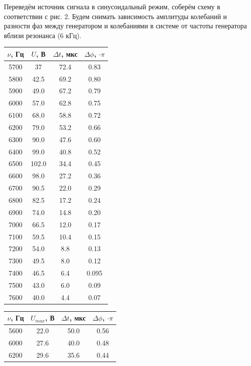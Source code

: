 \documentclass[a4paper,12pt]{extarticle}
\begin{document}
Переведём источник сигнала в синусоидальный режим, соберём схему в соответствии с рис. 2. Будем снимать зависимость амплитуды колебаний и разности фаз между генератором и колебаниями в системе от частоты генератора вблизи резонанса (6 кГц).
\begin{table}[h]
		\centering
		\begin{tabular}{|c|c|c|c|}
			\hline
			$\nu$, Гц & $U$, В & $\Delta t$, мкс & $\Delta \phi$, $\cdot \pi$ \\ \hline
			5700 & 37 & 72.4 & 0.83 \\ \hline
			5800 & 42.5 & 69.2 & 0.80 \\ \hline
			5900 & 49.0 & 67.2 & 0.79 \\ \hline
			6000 & 57.0 & 62.8 & 0.75 \\ \hline
			6100 & 68.0 & 58.8 & 0.72 \\ \hline
			6200 & 79.0 & 53.2 & 0.66 \\ \hline
			6300 & 90.0 & 47.6 & 0.60 \\ \hline
			6400 & 99.0 & 40.8 & 0.52 \\ \hline
			6500 & 102.0 & 34.4 & 0.45 \\ \hline
			6600 & 98.0 & 27.2 & 0.36 \\ \hline
			6700 & 90.5 & 22.0 & 0.29 \\ \hline
			6800 & 82.5 & 17.2 & 0.24 \\ \hline
			6900 & 74.0 & 14.8 & 0.20 \\ \hline
			7000 & 66.5 & 12.0 & 0.17 \\ \hline
			7100 & 59.5 & 10.4& 0.15 \\ \hline
			7200 & 54.0 & 8.8 & 0.13 \\ \hline
			7300 & 49.5 & 8.0 & 0.12 \\ \hline
			7400 & 46.5 & 6.4 & 0.095 \\ \hline
			7500 & 43.0 & 6.0 & 0.09 \\ \hline
			7600 & 40.0 & 4.4 & 0.07 \\ \hline
		\end{tabular}
		\hspace{.06\textwidth}
		\begin{tabular}{|c|c|c|c|}
			\hline
			$\nu$, Гц & $U_{max}$, В & $\Delta t$, мкс & $\Delta \phi$, $\cdot \pi$ \\ \hline
			5600 & 22.0 & 50.0 & 0.56 \\ \hline
			6000 & 27.6 & 40.0 & 0.48 \\ \hline
			6200 & 29.6 & 35.6 & 0.44 \\ \hline

\end{tabular}
\end{table}
\end{document}
